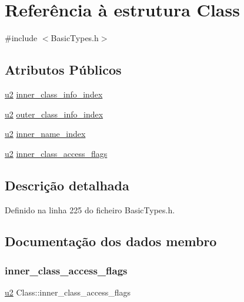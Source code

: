 \hypertarget{structClass}{}\section{Referência à estrutura Class}
\label{structClass}


{\ttfamily \#include $<$Basic\+Types.\+h$>$}

\subsection*{Atributos Públicos}
\begin{DoxyCompactItemize}
\item 
\hyperlink{BasicTypes_8h_a732cde1300aafb73b0ea6c2558a7a54f}{u2} \hyperlink{structClass_a77e310982b1471782be2caf432cb9af0}{inner\+\_\+class\+\_\+info\+\_\+index}
\item 
\hyperlink{BasicTypes_8h_a732cde1300aafb73b0ea6c2558a7a54f}{u2} \hyperlink{structClass_a57bc4e6c8f985b9ee267d190e612dca8}{outer\+\_\+class\+\_\+info\+\_\+index}
\item 
\hyperlink{BasicTypes_8h_a732cde1300aafb73b0ea6c2558a7a54f}{u2} \hyperlink{structClass_a21dcd0b51d443a4cbaa870d658281105}{inner\+\_\+name\+\_\+index}
\item 
\hyperlink{BasicTypes_8h_a732cde1300aafb73b0ea6c2558a7a54f}{u2} \hyperlink{structClass_aa595adf631b8edac3b1de407bf03ad07}{inner\+\_\+class\+\_\+access\+\_\+flags}
\end{DoxyCompactItemize}


\subsection{Descrição detalhada}


Definido na linha 225 do ficheiro Basic\+Types.\+h.



\subsection{Documentação dos dados membro}
\mbox{\label{structClass_aa595adf631b8edac3b1de407bf03ad07}} 
\subsubsection{\texorpdfstring{inner\+\_\+class\+\_\+access\+\_\+flags}{inner\_class\_access\_flags}}
{\footnotesize\ttfamily \hyperlink{BasicTypes_8h_a732cde1300aafb73b0ea6c2558a7a54f}{u2} Class\+::inner\+\_\+class\+\_\+access\+\_\+flags}



